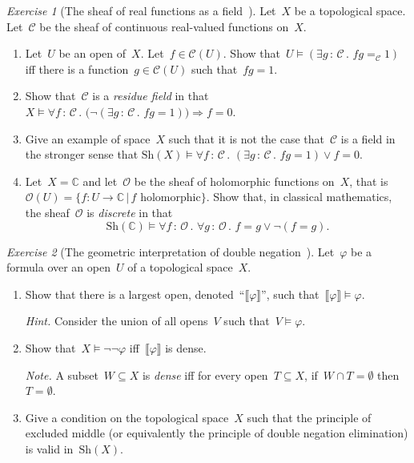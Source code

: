 \documentclass[10pt,reqno,a4paper,openany]{amsbook}
\theoremstyle{definition}
\theoremstyle{plain}
\theoremstyle{remark}
\newcommand{\CCC}{\mathcal{C}}
\newcommand{\OOO}{\mathcal{O}}
\newcommand{\CC}{\mathbb{C}}
\newcommand{\?}{\,{:}\,}
\renewcommand{\_}{\mathpunct{.}\,}
\newtheorem{exercise}{Exercise}[chapter]
\newcommand{\Sh}{\mathrm{Sh}}
\begin{document}
\begin{exercise}[{The sheaf of real functions as a
field~\cite[Exercise~28]{blechschmidt:generalized-spaces}}]
Let~$X$ be a topological space. Let~$\CCC$ be the sheaf of continuous real-valued
functions on~$X$.
\begin{enumerate}
\item Let~$U$ be an open of~$X$. Let~$f \in \CCC(U)$. Show that~$U \models (\exists g\?\CCC\_ fg =_\CCC
1)$ iff there is a function~$g \in \CCC(U)$ such that~$fg = 1$.
\item Show that~$\CCC$ is a \emph{residue field} in that
$X \models \forall f\?\CCC\_
  \bigl(\neg(\exists g\?\CCC\_ fg = 1)\bigr) \Rightarrow f = 0$.
\item Give an example of space~$X$ such that it is not the case that~$\CCC$ is a
field in the stronger sense that
$\Sh(X) \models \forall f\?\CCC\_ (\exists g\?\CCC\_ fg = 1) \vee f = 0$.
\item Let~$X = \CC$ and let~$\OOO$ be the sheaf of holomorphic functions on~$X$,
that is~$\OOO(U) = \{ f : U \to \CC \,|\, \text{$f$ holomorphic} \}$.
Show that, in classical mathematics, the sheaf~$\OOO$ is \emph{discrete} in that
\[ \Sh(\CC) \models \forall f\?\OOO\_ \forall g\?\OOO\_ f = g \vee \neg(f = g).
\]
\end{enumerate}

\end{exercise}
\begin{exercise}[{The geometric interpretation of double
negation~\cite[Exercise~26]{blechschmidt:generalized-spaces}}]
Let~$\varphi$ be a formula over an open~$U$ of a topological space~$X$.
\begin{enumerate}
\item Show that there is a largest open,
denoted~``$\llbracket\varphi\rrbracket$'', such
that~$\llbracket\varphi\rrbracket \models \varphi$.\smallskip

{\noindent\scriptsize\emph{Hint.} Consider the union of all opens~$V$ such that~$V
\models \varphi$.\par}

\item Show that~$X \models \neg\neg\varphi$ iff~$\llbracket\varphi\rrbracket$
is dense.

{\noindent\scriptsize\emph{Note.} A subset~$W \subseteq X$ is \emph{dense} iff
for every open~$T \subseteq X$, if~$W \cap T = \emptyset$ then~$T =
\emptyset$.\par}

\item Give a condition on the topological space~$X$ such that the principle of
excluded middle (or equivalently the principle of double negation elimination)
is valid in~$\Sh(X)$.
\end{enumerate}
\end{exercise}
\end{document}
